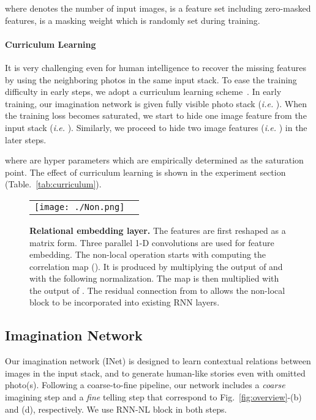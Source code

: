 \documentclass[letterpaper]{article} \usepackage{aaai20}  \usepackage{times}  \usepackage{helvet} \usepackage{courier}  \usepackage[hyphens]{url}  \usepackage{graphicx} \urlstyle{rm} \def\UrlFont{\rm}  \usepackage{graphicx}  \frenchspacing  \setlength{\pdfpagewidth}{8.5in}  \setlength{\pdfpageheight}{11in}
\newcommand{\figref}[1]{Fig.~\ref{#1}}
\newcommand{\tabref}[1]{Table.~\ref{#1}}
\newcommand{\ie}{{\it i.e. }}
\begin{document}
where  denotes the number of input images,  is a feature set including zero-masked features,  is a masking weight which is randomly set during training.



\paragraph{Curriculum Learning}
\quad

\noindent
It is very challenging even for human intelligence to recover the missing features by using the neighboring photos in the same input stack. To ease the training difficulty in early steps, we adopt a curriculum learning scheme~\cite{bengio2009curriculum}. In early training, our imagination network is given fully visible photo stack (\ie ). When the training loss becomes saturated, we start to hide one image feature from the input stack (\ie ). Similarly, we proceed to hide two image features (\ie ) in the later steps.



where  are hyper parameters which are empirically determined as the saturation point. The effect of curriculum learning is shown in the experiment section (\tabref{tab:curriculum}).


\begin{figure}[t]
\begin{center}
\def\arraystretch{1.0}
\begin{tabular}{@{}c@{\hskip 0.005\textwidth }c@{}}
\texttt{[image: ./Non.png]} \\
\end{tabular}
\end{center}
\caption{\textbf{Relational embedding layer.} The features are first reshaped as a matrix form. Three parallel 1-D convolutions are used for feature embedding. The non-local operation starts with computing the correlation map (). It is produced by multiplying the output of  and  with the following  normalization. The map is then multiplied with the output of . The residual connection from  to  allows the non-local block to be incorporated into existing RNN layers.}
\label{fig:non-local}
\end{figure}

\subsection{Imagination Network}
Our imagination network (INet) is designed to learn contextual relations between images in the input stack, and to generate human-like stories even with omitted photo(s). Following a coarse-to-fine pipeline, our network includes a \textit{coarse} imagining step and a \textit{fine} telling step that correspond to \figref{fig:overview}-(b) and (d), respectively. We use RNN-NL block in both steps.
\end{document}
